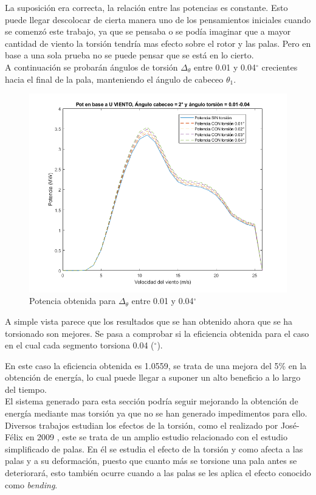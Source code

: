 La suposición era correcta, la relación entre las potencias es constante. Esto puede llegar descolocar de cierta manera uno de los pensamientos iniciales cuando se comenzó este trabajo, ya que se pensaba o se podía imaginar que a mayor cantidad de viento la torsión tendría mas efecto sobre el rotor y las palas. Pero en base a una sola prueba no se puede pensar que se está en lo cierto. \\


A continuación se probarán ángulos de torsión $\Delta_\theta$ entre 0.01 y 0.04$^{\circ}$ crecientes hacia el final de la pala, manteniendo el ángulo de cabeceo $\theta_1$.

\begin{figure}[H]
    \centering
    \includegraphics[width=1\textwidth]{images/0-10beau CP bueno 001-004.png}
    \caption{Potencia obtenida para $\Delta_\theta$ entre 0.01 y 0.04$^{\circ}$ }
     \label{fig:beau_torsion_001-004}
\end{figure}

A simple vista parece que los resultados que se han obtenido ahora que se ha torsionado son mejores. Se pasa a comprobar si la eficiencia obtenida para el caso en el cual cada segmento torsiona 0.04 ($^{\circ}$).

En este caso la eficiencia obtenida es 1.0559, se trata de una mejora del 5\% en la obtención de energía, lo cual puede llegar a suponer un alto beneficio a lo largo del tiempo.\\

El sistema generado para esta sección podría seguir mejorando la obtención de energía mediante mas torsión ya que no se han generado impedimentos para ello. Diversos trabajos estudian los efectos de la torsión, como el realizado por José-Félix en 2009 \cite{funes2009analisis} , este se trata de un amplio estudio relacionado con el estudio simplificado de palas. En él se estudia el efecto de la torsión y como afecta a las palas y a su deformación, puesto que cuanto más se torsione una pala antes se deteriorará, esto también ocurre cuando a las palas se les aplica el efecto conocido como \textit{bending}.\\

